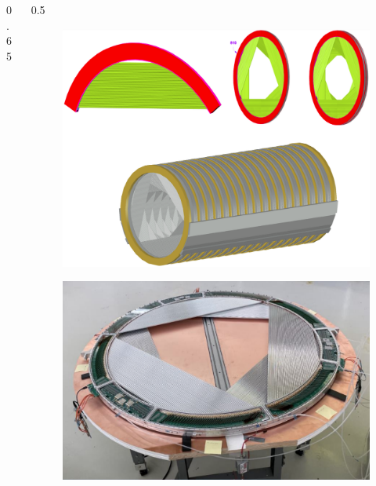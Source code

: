\documentclass{beamer}
\begin{document}
\begin{frame}
\begin{columns}
\begin{column}{0.65 \framewidth}
    \end{column}
    \begin{column}{0.5 \framewidth}
    \vspace{-10mm}
      \begin{figure}[H]
          \centering
\includegraphics[width=0.8\columnwidth]{figures/png/Screenshot_20240306_222803.png}
          \label{fig:enter-label} 
      \end{figure}
     \begin{figure}[H]
          \centering
            \includegraphics[width=0.8\columnwidth]{figures/png/Screenshot_20240706_163056.png}
          \label{fig:enter-label} 
      \end{figure}
    \end{column}
    \end{columns}
    \end{frame}
\end{document}
